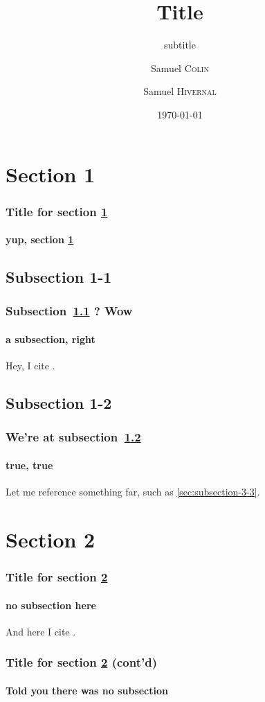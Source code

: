 \documentclass[blue]{beamer}
\title{Title}
\subtitle{subtitle}
\author[shortauthors]{
  Samuel \textsc{Colin}\inst{1} \and 
  Samuel \textsc{Hivernal}\inst{2}
}
\institute[shortinstitutes]{\inst{1}Institute1 
  \and \inst{2}Institute2
  \and Unrelated thing}
\date{\today}
\begin{document}
\begin{frame}
  \titlepage
\end{frame}


\section{Section 1}
\label{sec:section-1}

\begin{frame}
  \frametitle{Title for section \ref{sec:section-1}}
  \framesubtitle{yup, section \ref{sec:section-1}}

\end{frame}

\subsection{Subsection 1-1}
\label{sec:subsection-1-1}

\begin{frame}
  \frametitle{Subsection~\ref{sec:subsection-1-1} ? Wow}
  \framesubtitle{a subsection, right}

Hey, I cite \cite{test06}.

\end{frame}

\subsection{Subsection 1-2}
\label{sec:subsection-1-2}

\begin{frame}
  \frametitle{We're at subsection~\ref{sec:subsection-1-2}}
  \framesubtitle{true, true}

Let me reference something far, such as \ref{sec:subsection-3-3}.

\end{frame}


\section{Section 2}
\label{sec:section-2}

\begin{frame}
  \frametitle{Title for section \ref{sec:section-2}}
  \framesubtitle{no subsection here}

And here I cite \cite{test04}.

\end{frame}

\begin{frame}
  \frametitle{Title for section \ref{sec:section-2} (cont'd)}
  \framesubtitle{Told you there was no subsection}

\end{frame}
\end{document}
